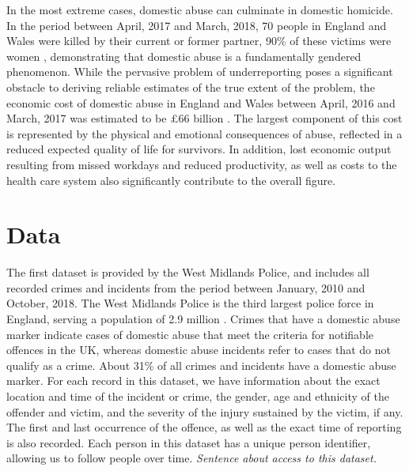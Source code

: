 \documentclass[11pt, a4paper]{article}
\begin{document}
In the most extreme cases, domestic abuse can culminate in domestic homicide. In the period between April, 2017 and March, 2018, 70 people in England and Wales were killed by their current or former partner, 90\% of these victims were women \cite{homic}, demonstrating that domestic abuse is a fundamentally gendered phenomenon. While the pervasive problem of underreporting poses a significant obstacle to deriving reliable estimates of the true extent of the problem, the economic cost of domestic abuse in England and Wales between April, 2016 and March, 2017 was estimated to be \pounds 66 billion \cite{costs}. The largest component of this cost is represented by the physical and emotional consequences of abuse, reflected in a reduced expected quality of life for survivors. In addition, lost economic output resulting from missed workdays and reduced productivity, as well as costs to the health care system also significantly contribute to the overall figure. 




\newpage


\section{Data}


The first dataset is provided by the West Midlands Police, and includes all recorded crimes and incidents from the period between January, 2010 and October, 2018. The West Midlands Police is the third largest police force in England, serving a population of 2.9 million \cite{Homeoffice}. Crimes that have a domestic abuse marker indicate cases of domestic abuse that meet the criteria for notifiable offences in the UK, whereas domestic abuse incidents refer to cases that do not qualify as a crime. About 31\% of all crimes and incidents have a domestic abuse marker. For each record in this dataset, we have information about the exact location and time of the incident or crime, the gender, age and ethnicity of the offender and victim, and the severity of the injury sustained by the victim, if any. The first and last occurrence of the offence, as well as the exact time of reporting is also recorded. Each person in this dataset has a unique person identifier, allowing us to follow people over time. \textit{Sentence about access to this dataset.}
\end{document}
